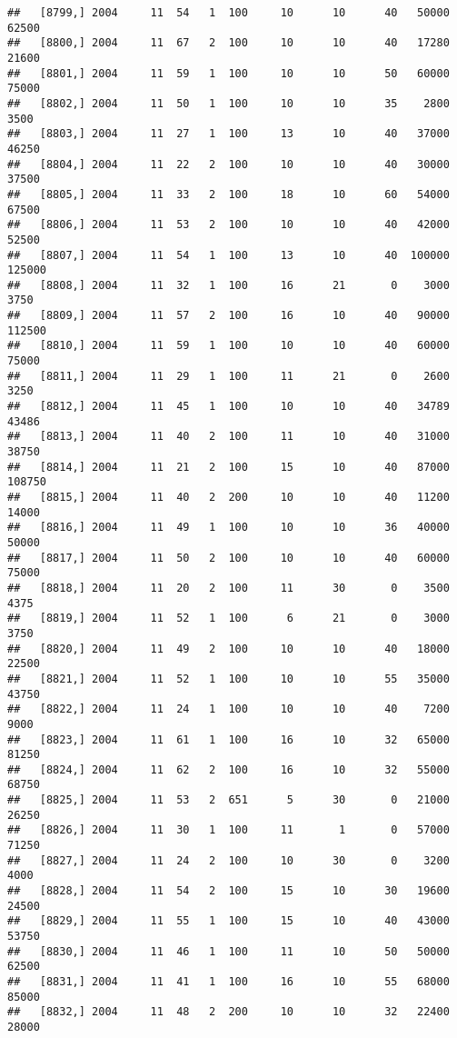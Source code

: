 \documentclass{article}\usepackage[]{graphicx}\usepackage[]{color}
\makeatletter
\newenvironment{kframe}{%
 \def\at@end@of@kframe{}%
 \ifinner\ifhmode%
  \def\at@end@of@kframe{\end{minipage}}%
  \begin{minipage}{\columnwidth}%
 \fi\fi%
 \def\FrameCommand##1{\hskip\@totalleftmargin \hskip-\fboxsep
 \colorbox{shadecolor}{##1}\hskip-\fboxsep
     \hskip-\linewidth \hskip-\@totalleftmargin \hskip\columnwidth}%
 \MakeFramed {\advance\hsize-\width
   \@totalleftmargin\z@ \linewidth\hsize
   \@setminipage}}%
 {\par\unskip\endMakeFramed%
 \at@end@of@kframe}
\newenvironment{knitrout}{}{} %
\makeatother
\begin{document}
\begin{knitrout}
\begin{kframe}
\begin{verbatim}
##   [8799,] 2004     11  54   1  100     10      10      40   50000   62500
##   [8800,] 2004     11  67   2  100     10      10      40   17280   21600
##   [8801,] 2004     11  59   1  100     10      10      50   60000   75000
##   [8802,] 2004     11  50   1  100     10      10      35    2800    3500
##   [8803,] 2004     11  27   1  100     13      10      40   37000   46250
##   [8804,] 2004     11  22   2  100     10      10      40   30000   37500
##   [8805,] 2004     11  33   2  100     18      10      60   54000   67500
##   [8806,] 2004     11  53   2  100     10      10      40   42000   52500
##   [8807,] 2004     11  54   1  100     13      10      40  100000  125000
##   [8808,] 2004     11  32   1  100     16      21       0    3000    3750
##   [8809,] 2004     11  57   2  100     16      10      40   90000  112500
##   [8810,] 2004     11  59   1  100     10      10      40   60000   75000
##   [8811,] 2004     11  29   1  100     11      21       0    2600    3250
##   [8812,] 2004     11  45   1  100     10      10      40   34789   43486
##   [8813,] 2004     11  40   2  100     11      10      40   31000   38750
##   [8814,] 2004     11  21   2  100     15      10      40   87000  108750
##   [8815,] 2004     11  40   2  200     10      10      40   11200   14000
##   [8816,] 2004     11  49   1  100     10      10      36   40000   50000
##   [8817,] 2004     11  50   2  100     10      10      40   60000   75000
##   [8818,] 2004     11  20   2  100     11      30       0    3500    4375
##   [8819,] 2004     11  52   1  100      6      21       0    3000    3750
##   [8820,] 2004     11  49   2  100     10      10      40   18000   22500
##   [8821,] 2004     11  52   1  100     10      10      55   35000   43750
##   [8822,] 2004     11  24   1  100     10      10      40    7200    9000
##   [8823,] 2004     11  61   1  100     16      10      32   65000   81250
##   [8824,] 2004     11  62   2  100     16      10      32   55000   68750
##   [8825,] 2004     11  53   2  651      5      30       0   21000   26250
##   [8826,] 2004     11  30   1  100     11       1       0   57000   71250
##   [8827,] 2004     11  24   2  100     10      30       0    3200    4000
##   [8828,] 2004     11  54   2  100     15      10      30   19600   24500
##   [8829,] 2004     11  55   1  100     15      10      40   43000   53750
##   [8830,] 2004     11  46   1  100     11      10      50   50000   62500
##   [8831,] 2004     11  41   1  100     16      10      55   68000   85000
##   [8832,] 2004     11  48   2  200     10      10      32   22400   28000

\end{verbatim}
\end{kframe}
\end{knitrout}
\end{document}
